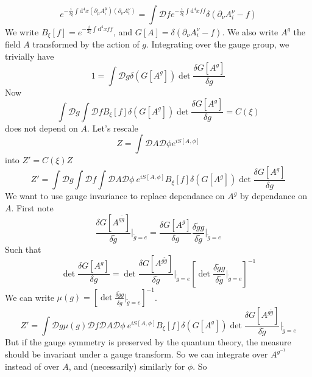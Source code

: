 \documentclass[a4paper]{book}
\theoremstyle{definition}
\theoremstyle{remark}
\begin{document}
\begin{equation}
    e^{-\frac{i}{2\xi}\int \text{d}^4x(\partial_\mu A^\mu_i)(\partial_\nu A^\nu_i)} = \int \mathcal Df e^{-\frac{i}{2\xi}\int \text{d}^4x ff} \delta(\partial_\nu A^\nu_i - f)
\end{equation}
We write $B_\xi[f] = e^{-\frac{i}{2\xi}\int \text{d}^4x ff}$, and $G[A] = \delta(\partial_\nu A^\nu_i - f)$. We also write $A^g$ the field $A$ transformed by the action of $g$. Integrating over the gauge group, we trivially have 
\begin{equation}
    1 = \int \mathcal D g \delta(G[A^g]) \det \frac{\delta G[A^g]}{\delta g}
\end{equation}
Now 
\begin{equation}
    \int \mathcal D g \int \mathcal D f B_\xi[f] \delta(G[A^g]) \det \frac{\delta G[A^g]}{\delta g} = C(\xi) 
\end{equation}
does not depend on $A$. Let's rescale 
\begin{equation}
    Z = \int \mathcal D A \mathcal D \phi e^{iS[A, \phi]}
\end{equation}
into $Z' = C(\xi) Z$
\begin{equation}
    Z' = \int \mathcal D g \int \mathcal D f\int \mathcal D A \mathcal D \phi ~e^{iS[A, \phi]} B_\xi[f] \delta(G[A^g]) \det \frac{\delta G[A^g]}{\delta g} 
\end{equation}
We want to use gauge invariance to replace dependance on $A^g$ by dependance on $A$. First note 
\begin{equation}
    \frac{\delta G[A^{g\tilde g}]}{\delta \tilde g} \Bigg|_{\tilde g = e} = \frac{\delta G[A^{g}]}{\delta g} \frac{\delta \tilde g g}{\delta \tilde g}\Bigg|_{\tilde g = e}
\end{equation}
Such that 
\begin{equation}
    \det \frac{\delta G[A^g]}{\delta g} = \det \frac{\delta G[A^{g\tilde g}]}{\delta \tilde g} \Bigg|_{\tilde g = e} \left[\det \frac{\delta \tilde g g}{\delta \tilde g}\Big|_{\tilde g = e}\right]^{-1}
\end{equation}
We can write $\mu(g) = \left[\det \frac{\delta \tilde g g}{\delta \tilde g}\Big|_{\tilde g = e}\right]^{-1}$. 
\begin{equation}
    Z' = \int \mathcal D g \mu(g) \mathcal D f \mathcal D A \mathcal D \phi ~e^{iS[A, \phi]} B_\xi[f] \delta(G[A^g]) \det \frac{\delta G[A^{g\tilde g}]}{\delta \tilde g} \Bigg|_{\tilde g = e} 
\end{equation}
But if the gauge symmetry is preserved by the quantum theory, the measure should be invariant under a gauge transform. So we can integrate over $A^{g^{-1}}$ instead of over $A$, and (necessarily) similarly for $\phi$. So 
\end{document}
